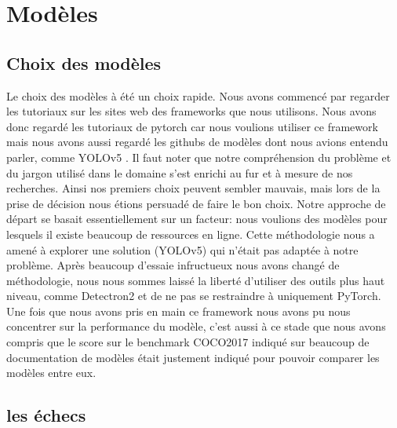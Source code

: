\chapter{Modèles}

\section{Choix des modèles}
Le choix des modèles à été un choix rapide.
Nous avons commencé par regarder les tutoriaux sur les sites web des frameworks que nous utilisons.
Nous avons donc regardé les tutoriaux de pytorch car nous voulions utiliser ce framework
mais nous avons aussi regardé les githubs de modèles dont nous avions entendu parler,
comme YOLOv5 . Il faut noter que notre compréhension du problème et du jargon utilisé dans le domaine
s’est enrichi au fur et à mesure de nos recherches. Ainsi nos premiers choix peuvent sembler mauvais,
mais lors de la prise de décision nous étions persuadé de faire le bon choix. Notre approche de départ
se basait essentiellement sur un facteur: nous voulions des modèles pour lesquels il existe beaucoup de
ressources en ligne. Cette méthodologie nous a amené à explorer une solution (YOLOv5) qui n’était pas adaptée
à notre problème. Après beaucoup d’essaie infructueux nous avons changé de méthodologie,
nous nous sommes laissé la liberté d’utiliser des outils plus haut niveau, comme Detectron2 et 
de ne pas se restraindre à uniquement PyTorch. Une fois que nous avons pris en main ce 
framework nous avons pu nous concentrer sur la performance du modèle, c'est
aussi à ce stade que nous avons compris que le score sur le benchmark COCO2017 indiqué sur 
beaucoup de documentation de modèles était justement indiqué pour pouvoir comparer les modèles entre eux.


\section{les échecs}
